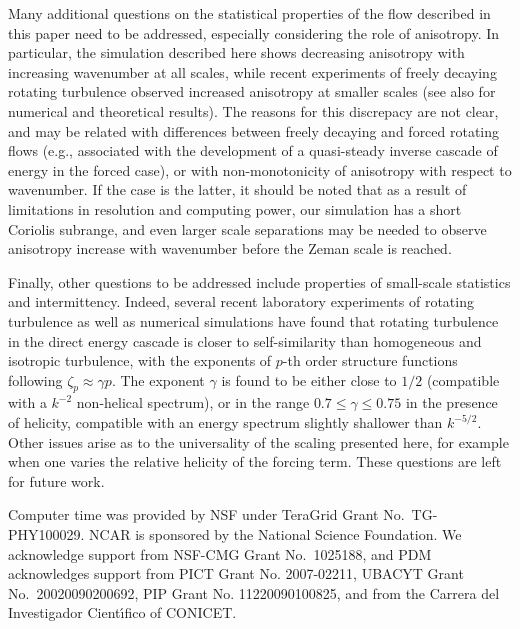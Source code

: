 \documentclass[aps,amsmath,amssymb,floatfix,showpacs]{revtex4}
\begin{document}
Many additional questions on the statistical properties of the flow described in this paper need to be addressed, especially considering the role of anisotropy. {In particular, the simulation described here shows decreasing anisotropy with increasing wavenumber at all scales, while recent experiments of freely decaying rotating turbulence \citep{Lamriben} observed increased anisotropy at smaller scales (see also \citealt{bellet_06} for numerical and theoretical results). The reasons for this discrepacy are not clear, and {may} be related with differences between freely decaying and forced rotating flows (e.g., associated with the development of a quasi-steady inverse cascade of energy in the forced case), or with non-monotonicity of anisotropy with respect to wavenumber. If the case is the latter, it should be noted that as a result of limitations in resolution and computing power, our simulation has a short Coriolis subrange, and even larger scale separations may be needed to observe anisotropy increase with wavenumber before the Zeman scale is reached.}

{Finally, other questions to be addressed include properties of} small-scale statistics and intermittency. Indeed, several recent laboratory experiments of rotating turbulence \citep{simand,baroud03,moisy,van} as well as numerical simulations \citep{muller, rot512, 1536b} have found that rotating turbulence in the direct energy cascade is closer to self-similarity than homogeneous and isotropic turbulence, with the exponents of $p$-th order structure functions following $\zeta_p \approx \gamma p$. The exponent $\gamma$ is found to be either close to $1/2$ (compatible with a $k^{-2}$ non-helical spectrum), or in the range $0.7\le \gamma \le 0.75$ in the presence of helicity, compatible with an energy spectrum slightly shallower than $k^{-5/2}$.  Other issues arise as to the universality of the scaling presented here, for example when one varies the relative helicity of the forcing term. These questions are left for future work.

\begin{acknowledgments}
Computer time was provided by NSF under TeraGrid Grant No.~TG-PHY100029. NCAR is sponsored by the National Science Foundation. We acknowledge support from NSF-CMG Grant No.~1025188, and PDM acknowledges support from PICT Grant No. 2007-02211, UBACYT Grant No.~20020090200692, PIP Grant No. 11220090100825, and from the Carrera del Investigador Cient\'{\i}fico of CONICET.
\end{acknowledgments}
\end{document}
